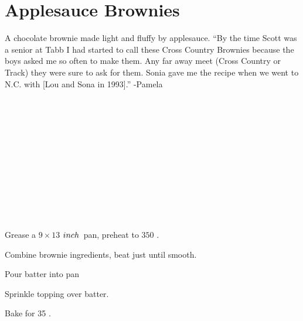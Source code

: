 \section[Applesauce Brownies]{Applesauce Brownies}


\begin{recipestats}[
	servings=16,
	preptime=15~\minute,
	bakingtime=35~\minute,
	source=Pam \& Sonia,
]
\end{recipestats}


\begin{recipeabstract}
	A chocolate brownie made light and fluffy by applesauce.
	``By the time Scott was a senior at Tabb I had started to call these Cross Country Brownies because the boys asked me so often to make them.
	Any far away meet (Cross Country or Track) they were sure to ask for them.
	Sonia gave me the recipe when we went to N.C. with [Lou and Sona in 1993].'' -Pamela
\end{recipeabstract}


\pagebreak[4] %
\begin{ingredientcolumns}
	\begin{ingredientblock}[brownie]
		\\
		\\
		\\
		\\
		\\
		\\
		\\
		\\
	\end{ingredientblock}

	\begin{ingredientblock}[topping]
		\\
		\\
	\end{ingredientblock}
\end{ingredientcolumns}


\begin{preparation}
\item Grease a $9\times13$ $inch$~pan, preheat to $350$ \Fahrenheit.
\item Combine brownie ingredients, beat just until smooth.
\item Pour batter into pan
\item Sprinkle topping over batter.
\item Bake for 35 \minute.
\end{preparation}


\recipeend%
